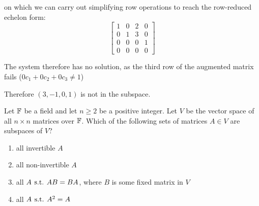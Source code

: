 \documentclass[a4paper, 11pt]{article}
\begin{document}
\begin{solution}
    on which we can carry out simplifying row operations to reach the row-reduced echelon form:
    \[
        \left[\begin{array}{cccc}
                1 & 0 & 2 & 0 \\
                0 & 1 & 3 & 0 \\
                0 & 0 & 0 & 1 \\
                0 & 0 & 0 & 0
            \end{array}\right]
    \]

    The system therefore has no solution, as the third row of the augmented matrix fails (\(0c_1 + 0c_2 + 0c_3 \neq 1\))

    Therefore \((3, -1, 0, 1)\) is not in the subspace.
\end{solution}

\begin{problem} 
Let \(\mathbb{F}\) be a field and let \(n \geq 2\) be a positive integer. Let \(V\) be the vector space of all \(n \times n\) matrices over \(\mathbb{F}\). Which of the following sets of matrices \(A \in V\) are subspaces of \(V\)?
\begin{enumerate}
    \item all invertible \(A\)
    \item all non-invertible \(A\)
    \item all \(A \hspace*{4pt}\text{s.t.}\hspace*{4pt} AB = BA\), where \(B\) is some fixed matrix in \(V\)
    \item all \(A \hspace*{4pt}\text{s.t.}\hspace*{4pt} A^2 = A\)
\end{enumerate}
\end{problem}
\end{document}
